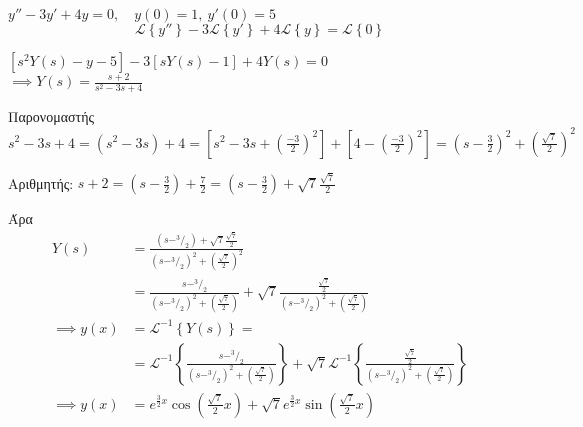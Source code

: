 \documentclass[11pt,a4paper,titlepage,final]{article}
\begin{document}
\begin{exercise*}{12.4}
	\(y''-3y'+4y=0, \quad y(0)=1,\ y'(0)=5\)
	\tcblower
	\[
	\mathscr L \left\lbrace y'' \right\rbrace - 3\mathscr L\left\lbrace y' \right\rbrace
	+4\mathscr L\left\lbrace y \right\rbrace = \mathscr L\left\lbrace 0 \right\rbrace
	\]

	\( \left[s^2Y(s)-y-5\right] -3\left[sY(s)-1 \right] + 4Y(s) = 0\) \\
	\( \implies Y(s) = \frac{s+2}{s^2-3s+4} \)

    Παρονομαστής \( s^2-3s+4 = (s^2-3s)+4 = \left[ s^2-3s+\left(
    \frac{-3}{2}
    \right)^2 \right] +
    \left[ 4-\left(
    \frac{-3}{2}
    \right)^2 \right] = \left(
    s-\frac{3}{2}
    \right)^2 + \left(\frac{\sqrt{7}}{2}\right)^2
    \)

    Αριθμητής: \( s+2 = \left(s-\frac{3}{2}\right) + \frac{7}{2}
    = \left(s-\frac{3}{2}\right)+ \sqrt{7}\frac{\sqrt{7}}{2}
    \)

    Άρα \begin{align*}
    Y(s) &= \frac{(s-^3/_2)+\sqrt{7}\frac{\sqrt{7}}{2}}{(s-^3/_2)^2+\left(\frac{\sqrt{7}}{2}\right)^2}
    \\ &=
    \frac{s-^3/_2}{(s- ^3/_2)^2+\left(\frac{\sqrt{7}}{2}\right)}+\sqrt{7}\frac{\frac{\sqrt{7}}{2}}{(s-^3/_2)^2+\left(\frac{\sqrt{7}}{2}\right)} \\
    \implies y(x) &= \mathscr L^{-1} \left\lbrace Y(s) \right\rbrace = \\
    &= \mathscr L^{-1}\left\lbrace
    \frac{s-^3/_2}{(s- ^3/_2)^2+\left(\frac{\sqrt{7}}{2}\right)}
    \right\rbrace + \sqrt{7} \mathscr L^{-1} \left\lbrace
    \frac{\frac{\sqrt{7}}{2}}{(s-^3/_2)^2+\left(\frac{\sqrt{7}}{2}\right)}
     \right\rbrace \\
     \implies y(x) &= e^{\frac{3}{2}x}\cos(\frac{\sqrt{7}}{2}x)+\sqrt{7}e^{\frac{3}{2}x}\sin(\frac{\sqrt{7}}{2}x)
     \end{align*}
\end{exercise*}
\end{document}
